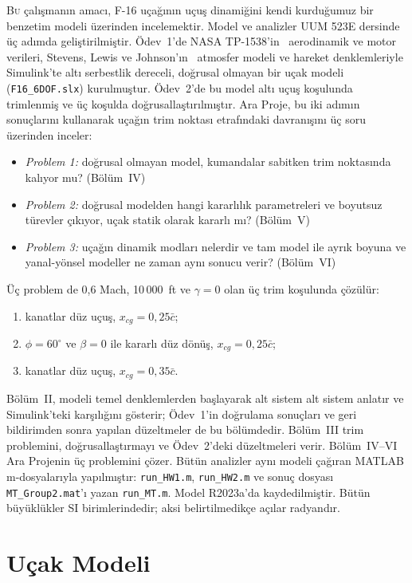 \documentclass[conf]{new-aiaa}
\begin{document}
\lettrine{B}{u} çalışmanın amacı, F-16 uçağının uçuş dinamiğini kendi kurduğumuz bir benzetim modeli üzerinden incelemektir. Model ve analizler UUM 523E dersinde üç adımda geliştirilmiştir. Ödev~1'de NASA TP-1538'in~\cite{tp1538} aerodinamik ve motor verileri, Stevens, Lewis ve Johnson'ın~\cite{slj} atmosfer modeli ve hareket denklemleriyle Simulink'te altı serbestlik dereceli, doğrusal olmayan bir uçak modeli (\texttt{F16\_6DOF.slx}) kurulmuştur. Ödev~2'de bu model altı uçuş koşulunda trimlenmiş ve üç koşulda doğrusallaştırılmıştır. Ara Proje, bu iki adımın sonuçlarını kullanarak uçağın trim noktası etrafındaki davranışını üç soru üzerinden inceler:
\begin{itemize}
\item \emph{Problem 1:} doğrusal olmayan model, kumandalar sabitken trim noktasında kalıyor mu? (Bölüm~IV)
\item \emph{Problem 2:} doğrusal modelden hangi kararlılık parametreleri ve boyutsuz türevler çıkıyor, uçak statik olarak kararlı mı? (Bölüm~V)
\item \emph{Problem 3:} uçağın dinamik modları nelerdir ve tam model ile ayrık boyuna ve yanal-yönsel modeller ne zaman aynı sonucu verir? (Bölüm~VI)
\end{itemize}
Üç problem de 0,6 Mach, 10\,000~ft ve $\gamma=0$ olan üç trim koşulunda çözülür:
\begin{enumerate}
\item[i.] kanatlar düz uçuş, $x_{cg}=0,25\bar c$;
\item[ii.] $\phi=60^\circ$ ve $\beta=0$ ile kararlı düz dönüş, $x_{cg}=0,25\bar c$;
\item[iii.] kanatlar düz uçuş, $x_{cg}=0,35\bar c$.
\end{enumerate}

Bölüm~II, modeli temel denklemlerden başlayarak alt sistem alt sistem anlatır ve Simulink'teki karşılığını gösterir; Ödev~1'in doğrulama sonuçları ve geri bildirimden sonra yapılan düzeltmeler de bu bölümdedir. Bölüm~III trim problemini, doğrusallaştırmayı ve Ödev~2'deki düzeltmeleri verir. Bölüm~IV--VI Ara Projenin üç problemini çözer. Bütün analizler aynı modeli çağıran MATLAB m-dosyalarıyla yapılmıştır: \texttt{run\_HW1.m}, \texttt{run\_HW2.m} ve sonuç dosyası \texttt{MT\_Group2.mat}'ı yazan \texttt{run\_MT.m}. Model R2023a'da kaydedilmiştir. Bütün büyüklükler SI birimlerindedir; aksi belirtilmedikçe açılar radyandır.

\section{Uçak Modeli}
\end{document}
